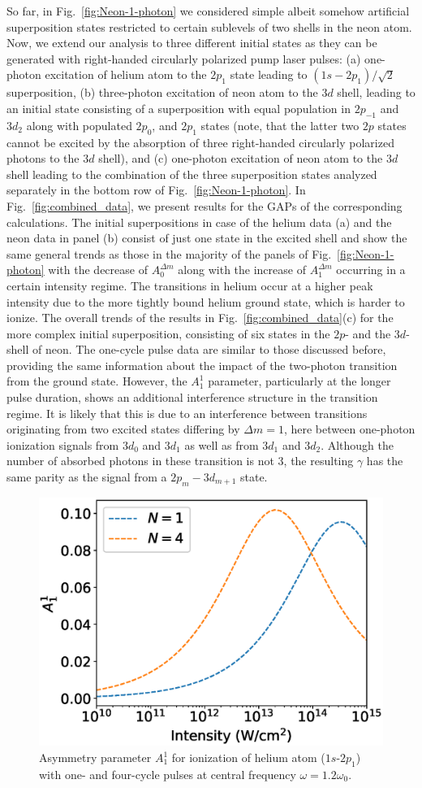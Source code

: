 So far, in Fig.~\ref{fig:Neon-1-photon} we considered simple albeit somehow artificial superposition states restricted to certain sublevels of two shells in the neon atom. Now, we extend our analysis to three different initial states as they can be generated with right-handed circularly polarized pump laser pulses: (a) one-photon excitation of helium atom to the $2p_1$ state leading to $(1s-2p_1)/\sqrt{2}$ superposition, (b) three-photon excitation of neon atom to the $3d$  shell, leading to an initial state consisting of a superposition with equal population in $2p_{-1}$ and $3d_2$ along with populated $2p_0$, and $2p_1$ states (note, that the latter two $2p$ states cannot be excited by the absorption of three right-handed circularly polarized photons to the $3d$ shell), and (c) one-photon excitation of neon atom to the $3d$ shell leading to the combination of the three superposition states analyzed separately in the bottom row of Fig.~\ref{fig:Neon-1-photon}.
In Fig.~\ref{fig:combined_data}, we present results for the GAPs of the corresponding calculations.
The initial superpositions in case of the helium data (a) and the neon data in panel (b) consist of just one state in the excited shell and show the same general trends as those in the majority of the panels of  Fig.~\ref{fig:Neon-1-photon} with the decrease of $A_0^{\Delta m}$ along with the increase of $A_1^{\Delta m}$ occurring in a certain  intensity regime. The transitions in helium occur at a higher peak intensity due to the more tightly bound helium ground state, which is harder to ionize.  
The overall trends of the results in Fig.~\ref{fig:combined_data}(c) for the more complex initial superposition, consisting of six states in the $2p$- and the $3d$-shell of neon.
The one-cycle pulse data are similar to those discussed before, providing the same information about the impact of the two-photon transition from the ground state. However, the $A_1^1$ parameter, particularly at the longer pulse duration, shows an additional interference structure in the transition regime. It is likely that this is due
to an interference between transitions originating from two excited states differing by $\Delta m = 1$, here between one-photon ionization signals
from $3d_0$ and $3d_1$ as well as from $3d_1$ and $3d_2$. Although the number of absorbed photons in these transition is not 3, the resulting $\gamma$ has the same parity as the signal from a $2p_m-3d_{m+1}$ state.

\begin{figure}[t]
\centering
\includegraphics[width=.45\linewidth]{figs/Photo_ionization/GAP/He_2p1_detune_1p2.eps}
\caption{ 
Asymmetry parameter $A_1^1$ for ionization of helium atom ($1s$-$2p_1$) with one- and four-cycle pulses at central frequency 
$\omega=1.2\omega_0$.
} 
  \label{fig:detuned_GAP}
\end{figure}

